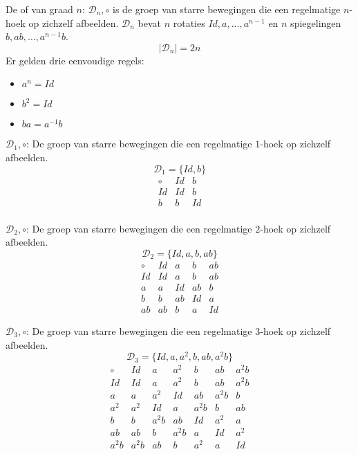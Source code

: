 \documentclass[main.tex]{subfiles}
\begin{document}

\begin{de}
  De  of  van graad $n$: $\mathcal{D}_{n},\circ$ is de groep van starre bewegingen die een regelmatige $n$-hoek op zichzelf afbeelden.
  $\mathcal{D}_{n}$ bevat $n$ rotaties $Id, a, \dotsc, a^{n-1}$ en $n$ spiegelingen $b,ab,\dotsc,a^{n-1}b$.
  \[ |\mathcal{D}_{n}| = 2n \]
  Er gelden drie eenvoudige regels:
  \begin{itemize}
  \item $a^{n} = Id$
  \item $b^{2} = Id$
  \item $ba = a^{-1}b$
  \end{itemize}
\commn \cycln
\end{de}

\begin{vb}
  $\mathcal{D}_{1},\circ$: De groep van starre bewegingen die een regelmatige $1$-hoek op zichzelf afbeelden.
  \[ \mathcal{D}_{1} = \{ Id, b \} \]
  \[
  \begin{array}{c|cccccc}
    \circ & Id & b\\
    \hline
    Id & Id & b\\
    b & b & Id\\
  \end{array}
  \]
\commj {}
\end{vb}

\begin{vb}
  $\mathcal{D}_{2},\circ$: De groep van starre bewegingen die een regelmatige $2$-hoek op zichzelf afbeelden.
  \[ \mathcal{D}_{2} = \{ Id, a, b, ab \} \]
  \[
  \begin{array}{c|cccccc}
    \circ & Id & a & b & ab\\
    \hline
    Id & Id & a & b & ab\\
    a & a & Id & ab & b\\
    b & b & ab & Id & a\\
    ab & ab & b & a & Id
  \end{array}
  \]
\commj \cycln
\end{vb}

\begin{vb}
  $\mathcal{D}_{3},\circ$: De groep van starre bewegingen die een regelmatige $3$-hoek op zichzelf afbeelden.
  \[ \mathcal{D}_{3} = \{ Id, a, a^{2}, b, ab, a^{2}b \} \]
  \[
  \begin{array}{c|cccccc}
    \circ & Id & a & a^{2} & b & ab & a^{2}b\\
    \hline
    Id & Id & a & a^{2} & b & ab & a^{2}b \\
    a & a & a^{2} & Id & ab & a^{2}b & b \\
    a^{2} & a^{2} & Id & a & a^{2}b & b & ab \\
    b & b & a^{2}b & ab & Id & a^{2} & a \\
    ab & ab & b & a^{2}b & a & Id & a^{2} \\
    a^{2}b & a^{2}b & ab & b & a^{2} & a & Id \\
  \end{array}
  \]
\commn \cycln
\end{vb}
\end{document}
